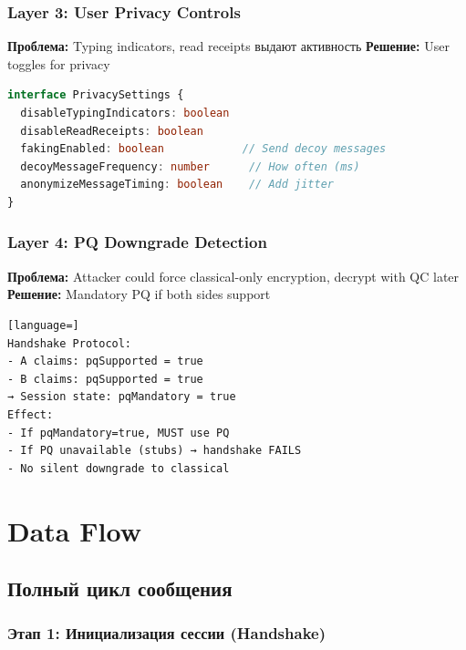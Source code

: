 \documentclass[11pt,a4paper,oneside]{book}
\begin{document}
\vspace{-0.2cm}\subsection{Layer 3: User Privacy Controls}
\textbf{Проблема:} Typing indicators, read receipts выдают активность
\textbf{Решение:} User toggles for privacy
\begin{lstlisting}[language=TypeScript]
interface PrivacySettings {
  disableTypingIndicators: boolean
  disableReadReceipts: boolean
  fakingEnabled: boolean            // Send decoy messages
  decoyMessageFrequency: number      // How often (ms)
  anonymizeMessageTiming: boolean    // Add jitter
}
\end{lstlisting}
\vspace{-0.2cm}\subsection{Layer 4: PQ Downgrade Detection}
\textbf{Проблема:} Attacker could force classical-only encryption, decrypt with QC later
\textbf{Решение:} Mandatory PQ if both sides support
\begin{lstlisting}[language=]
Handshake Protocol:
- A claims: pqSupported = true
- B claims: pqSupported = true
→ Session state: pqMandatory = true
Effect:
- If pqMandatory=true, MUST use PQ
- If PQ unavailable (stubs) → handshake FAILS
- No silent downgrade to classical
\end{lstlisting}
\vspace{-0.5cm}\chapter{Data Flow}
\vspace{-0.3cm}\section{Полный цикл сообщения}
\vspace{-0.2cm}\subsection{Этап 1: Инициализация сессии (Handshake)}
\end{document}
